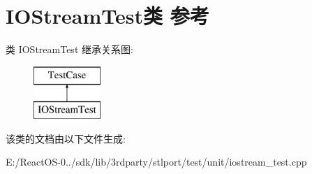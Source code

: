 \hypertarget{class_i_o_stream_test}{}\section{I\+O\+Stream\+Test类 参考}
\label{class_i_o_stream_test}
类 I\+O\+Stream\+Test 继承关系图\+:\begin{figure}[H]
\begin{center}
\leavevmode
\includegraphics[height=2.000000cm]{class_i_o_stream_test}
\end{center}
\end{figure}


该类的文档由以下文件生成\+:\begin{DoxyCompactItemize}
\item 
E\+:/\+React\+O\+S-\/0../sdk/lib/3rdparty/stlport/test/unit/iostream\+\_\+test.\+cpp\end{DoxyCompactItemize}
